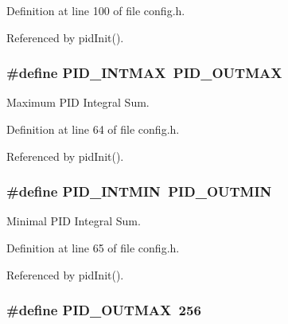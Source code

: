 Definition at line 100 of file config.\-h.



Referenced by pid\-Init().

\hypertarget{group__config_ga50582411cbb3f8a20ffd3aa2254ddf71}{
\subsubsection[{P\-I\-D\-\_\-\-I\-N\-T\-M\-A\-X}]{\setlength{\rightskip}{0pt plus 5cm}\#define P\-I\-D\-\_\-\-I\-N\-T\-M\-A\-X~{\bf P\-I\-D\-\_\-\-O\-U\-T\-M\-A\-X}}}\label{group__config_ga50582411cbb3f8a20ffd3aa2254ddf71}


Maximum P\-I\-D Integral Sum. 



Definition at line 64 of file config.\-h.



Referenced by pid\-Init().

\hypertarget{group__config_ga9ee651f30455f25b5ca4c4bb9a0a6e49}{
\subsubsection[{P\-I\-D\-\_\-\-I\-N\-T\-M\-I\-N}]{\setlength{\rightskip}{0pt plus 5cm}\#define P\-I\-D\-\_\-\-I\-N\-T\-M\-I\-N~{\bf P\-I\-D\-\_\-\-O\-U\-T\-M\-I\-N}}}\label{group__config_ga9ee651f30455f25b5ca4c4bb9a0a6e49}


Minimal P\-I\-D Integral Sum. 



Definition at line 65 of file config.\-h.



Referenced by pid\-Init().

\hypertarget{group__config_gaf36e4eab421932a006c7df7e84f11cf0}{
\subsubsection[{P\-I\-D\-\_\-\-O\-U\-T\-M\-A\-X}]{\setlength{\rightskip}{0pt plus 5cm}\#define P\-I\-D\-\_\-\-O\-U\-T\-M\-A\-X~256}}\label{group__config_gaf36e4eab421932a006c7df7e84f11cf0}


